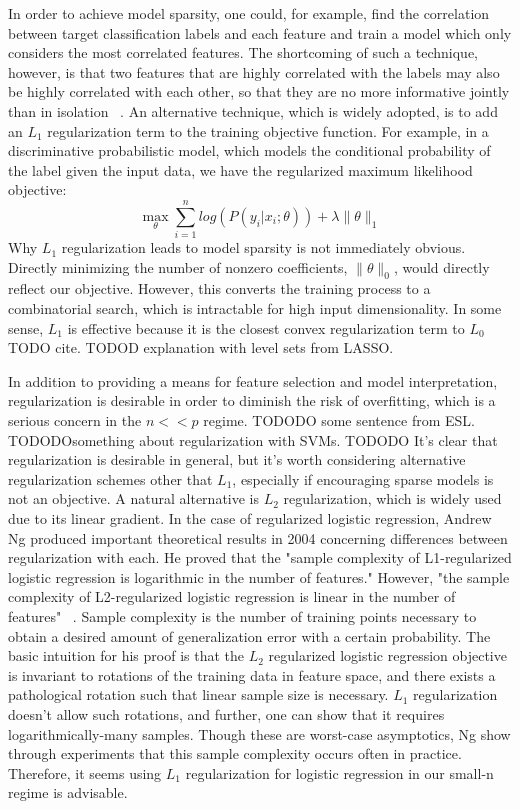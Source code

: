 \documentclass[]{article}
\begin{document}
	In order to achieve model sparsity, one could, for example, find the correlation between target classification labels and each feature and train a model which only considers the most correlated features. The shortcoming of such a technique, however, is that two features that are highly correlated with the labels may also be highly correlated with each other, so that they are no more informative jointly than in isolation ~\cite{tibshirani1996regression}. An alternative technique, which is widely adopted, is to add an $L_1$ regularization term to the training objective function. For example, in a discriminative probabilistic model, which models the conditional probability of the label given the input data, we have the regularized maximum likelihood objective: 
	$$\max_{\theta} \sum_{i = 1}^n log\left(P(y_i | x_i; \theta)\right) + \lambda \lVert \theta \rVert_1$$
Why $L_1$ regularization leads to model sparsity is not immediately obvious. Directly minimizing the number of nonzero coefficients, $\lVert \theta \rVert_0$, would directly reflect our objective. However, this converts the training process to a combinatorial search, which is intractable for high input dimensionality. In some sense, $L_1$ is effective because it is the closest convex regularization term to $L_0$ TODO cite. TODOD explanation with level sets from LASSO. 
	
	In addition to providing a means for feature selection and model interpretation, regularization is desirable in order to diminish the risk of overfitting, which is a serious concern in the $n << p$ regime. TODODO some sentence from ESL. TODODOsomething about regularization with SVMs. TODODO
	It's clear that regularization is desirable in general, but it's worth considering alternative regularization schemes other that $L_1$, especially if encouraging sparse models is not an objective. A natural alternative is $L_2$ regularization, which is widely used due to its linear gradient. In the case of regularized logistic regression, Andrew Ng produced important theoretical results in 2004 concerning differences between regularization with each. He proved that the "sample complexity of L1-regularized logistic regression is logarithmic in the number of features." However,  "the sample complexity of L2-regularized logistic regression is linear in the number of features"  ~\cite{ng2004feature}. Sample complexity is the number of training points necessary to obtain a desired amount of generalization error with a certain probability. The basic intuition for his proof is that the $L_2$ regularized logistic regression objective is invariant to rotations of the training data in feature space, and there exists a pathological rotation such that linear sample size is necessary. $L_1$ regularization doesn't allow such rotations, and further, one can show that it requires logarithmically-many samples. Though these are worst-case asymptotics, Ng show through experiments that  this sample complexity occurs often in practice. Therefore, it seems using $L_1$ regularization for logistic regression in our small-n regime is advisable. 
\end{document}
